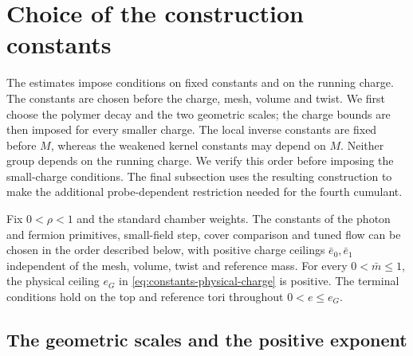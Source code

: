 \section{Choice of the construction constants}\label{sec:ordered-constants}

The estimates impose conditions on fixed constants and on the
running charge. The constants are chosen before the charge, mesh,
volume and twist. We first choose the polymer decay and the two
geometric scales; the charge bounds are then imposed for every
smaller charge. The local inverse constants are fixed before $M$,
whereas the weakened kernel constants may depend on $M$.
Neither group depends on the running charge. We verify this order
before imposing the small-charge conditions. The final subsection
uses the resulting construction to make the additional probe-dependent
restriction needed for the fourth cumulant.

\begin{proposition}\label{prop:ordered-constants}
Fix $0<\rho<1$ and the standard chamber weights.
The constants of the photon and fermion primitives,
small-field step, cover comparison and tuned flow can
be chosen in the order described below, with positive
charge ceilings $\bar e_0,\bar e_1$ independent of the mesh,
volume, twist and reference mass.
For every $0<\bar m\le1$, the physical ceiling $e_G$
in \eqref{eq:constants-physical-charge} is positive.
The terminal conditions 
hold on the top and reference tori throughout
$0<e\le e_G$.
\end{proposition}

\subsection{The geometric scales and the positive exponent}

